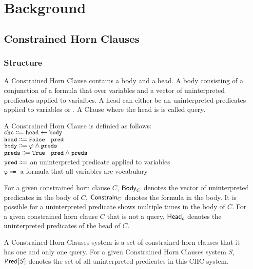 \section{Background}
\label{sec:background}

\subsection{Constrained Horn Clauses}
\label{sec:chcs}

\subsubsection{Structure}
A Constrained Horn Clause contains a body and a head.
%
A body consisting of a conjunction of a formula that over variables and a vector of uninterpreted predicates applied to varialbes.
%
A head can either be an uninterpreted predicates applied to variables or .
%
A Clause where the head is  is called query.
\begin{defn}
  A Constrained Horn Clause is definied as follows: \\
  $\cc{chc} \Coloneqq \cc{head} \gets \cc{body}$ \\
  $\cc{head} \Coloneqq \cc{False} \mid \cc{pred}$  \\
  $\cc{body} \Coloneqq \varphi \wedge \cc{preds}$ \\
  $\cc{preds} \Coloneqq \cc{True} \mid \cc{pred} \wedge \cc{preds}$ \\
  $\cc{pred} \Coloneqq$ an uninterpreted predicate applied to variables \\
  $\varphi \Coloneqq$ a formula that all variables are vocabulary \\
\end{defn}
%
For a given constrained horn clause $C$, $\mathsf{Body}_{C}$ denotes
the vector of uninterpreted predicates in the body of $C$, $\mathsf{Constrain}_{C}$
denotes the formula in the body.
%
It is possible for a uninterpreted predicate shows multiple times in the
body of $C$.
%
For a given constrained horn clause $C$ that is not a query,
$\mathsf{Head}_{c}$ denotes the uninterpreted predicates of the head of $C$.
%

A Constrained Horn Clauses system is a set of constrained horn clauses 
that it has one and only one query.
%
For a given Constrained Horn Clauses system $S$,$\mathsf{Pred}[ S ]$ denotes 
the set of all uninterpreted predicates in this CHC system.

